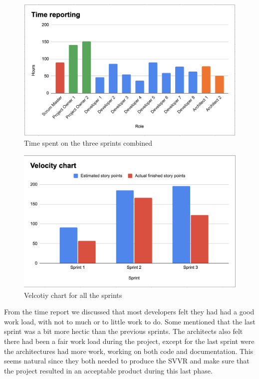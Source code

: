 \documentclass{article}
\begin{document}
\begin{figure}[H]
    \centering
    \includegraphics[scale=0.6]{pfrFigures/TimeReporting.png}
    \caption{Time spent on the three sprints combined}
    \label{fig:timereport}
\end{figure}

\begin{figure}[H]
    \centering
    \includegraphics[scale=0.6]{pfrFigures/Velocity.png}
    \caption{Velcotiy chart for all the sprints}
    \label{fig:Velocity1}
\end{figure}

From the time report we discussed that most developers felt they had had a good work load, with not to much or to little work to do. Some mentioned that the last sprint was a bit more hectic than the previous sprints. The architects also felt there had been a fair work load during the project, except for the last sprint were the architectures had more work, working on both code and documentation. This seems natural since they both needed to produce the SVVR and make sure that the project resulted in an acceptable product during this last phase. 
\end{document}
